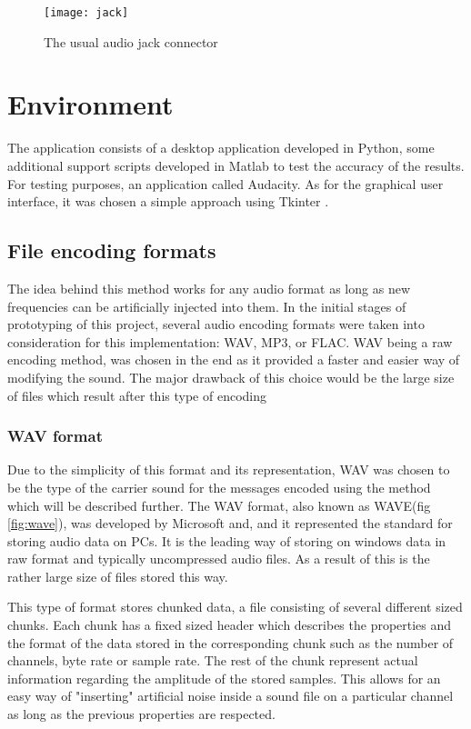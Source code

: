 \documentclass[12pt]{report}
\begin{document}
\begin{figure}[h]
\centering
\texttt{[image: jack]}
\caption{The usual audio jack connector}
\label{fig:jack}
\end{figure}

\section{Environment}
The application consists of a desktop application developed in Python, some additional support scripts developed in Matlab to test the accuracy of the results. For testing purposes, an application called Audacity. As for the graphical user interface, it was chosen a simple approach using Tkinter
.
\subsection{File encoding formats}
The idea behind this method works for any audio format as long as new frequencies can be artificially injected into them. In the initial stages of prototyping of this project, several audio encoding formats were taken into consideration for this implementation: WAV, MP3, or FLAC. WAV being a raw encoding method, was chosen in the end as it provided a faster and easier way of modifying the sound. The major drawback of this choice would be the large size of files which result after this type of encoding
\subsubsection{WAV format}
Due to the simplicity of this format and its representation, WAV was chosen to be the type of the carrier sound for the messages encoded using the method which will be described further.
The WAV format, also known as WAVE(fig \ref{fig:wave}), was developed by Microsoft and, and it represented the standard for storing audio data on PCs. It is the leading way of storing on windows data in raw format and typically uncompressed audio files. As a result of this is the rather large size of files stored this way.

This type of format stores chunked data, a file consisting of several different sized chunks. Each chunk has a fixed sized header which describes the properties and the format of the data stored in the corresponding chunk such as the number of channels, byte rate or sample rate. The rest of the chunk represent actual information regarding the amplitude of the stored samples. This allows for an easy way of "inserting" artificial noise inside a sound file on a particular channel as long as the previous properties are respected.
\end{document}

